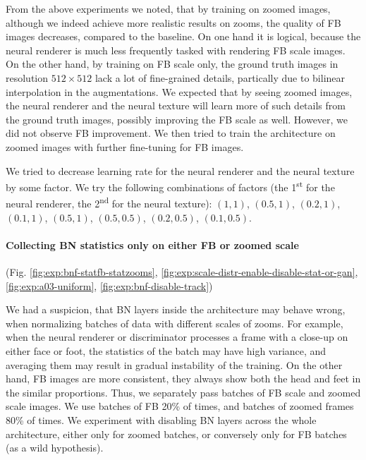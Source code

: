 From the above experiments we noted, that by training on zoomed images, although we indeed achieve more realistic results on zooms, the quality of FB images decreases, compared to the baseline. On one hand it is logical, because the neural renderer is much less frequently tasked with rendering FB scale images. On the other hand, by training on FB scale only, the ground truth images in resolution $512 \times 512$ lack a lot of fine-grained details, partically due to bilinear interpolation in the augmentations. We expected that by seeing zoomed images, the neural renderer and the neural texture will learn more of such details from the ground truth images, possibly improving the FB scale as well. However, we did not observe FB improvement. We then tried to train the architecture on zoomed images with further fine-tuning for FB images.

We tried to decrease learning rate for the neural renderer and the neural texture by some factor. We try the following combinations of factors (the 1\textsuperscript{st} for the neural renderer, the 2\textsuperscript{nd} for the neural texture): $(1, 1)$, $(0.5, 1)$, $(0.2, 1)$, $(0.1, 1)$, $(0.5, 1)$, $(0.5, 0.5)$, $(0.2, 0.5)$, $(0.1, 0.5)$.

\vspace{-15pt}\paragraph{Collecting BN statistics only on either FB or zoomed scale}(Fig. \ref{fig:exp:bnf-statfb-statzooms}, \ref{fig:exp:scale-distr-enable-disable-stat-or-gan}, \ref{fig:exp:a03-uniform}, \ref{fig:exp:bnf-disable-track})\mbox{}\nopagebreak

We had a suspicion, that BN layers inside the architecture may behave wrong, when normalizing batches of data with different scales of zooms. For example, when the neural renderer or discriminator processes a frame with a close-up on either face or foot, the statistics of the batch may have high variance, and averaging them may result in gradual instability of the training. On the other hand, FB images are more consistent, they always show both the head and feet in the similar proportions. Thus, we separately pass batches of FB scale and zoomed scale images. We use batches of FB 20\% of times, and batches of zoomed frames 80\% of times. We experiment with disabling BN layers across the whole architecture, either only for zoomed batches, or conversely only for FB batches (as a wild hypothesis). 


